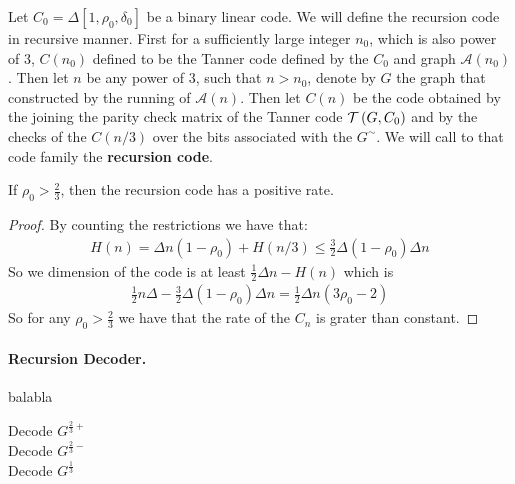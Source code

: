 \documentclass{article}
\begin{document}
\begin{definition} Let $C_{0}=\Delta[1,\rho_{0}, \delta_{0}]$ be a binary linear code.  We will define the recursion code in recursive manner. First for a sufficiently large integer $n_{0}$, which is also power of $3$, $C\left( n_{0} \right)$ defined to be the Tanner code defined by the $C_{0}$ and graph $\mathcal{A}\left( n_{0} \right)$. Then let $n$ be any power of $3$, such that $n > n_{0}$, denote by $G$ the graph that constructed by the running of $\mathcal{A}\left( n \right)$.  Then let $C\left( n \right)$ be the code obtained by the joining the parity check matrix of the Tanner code $\mathcal{T}\left( G, C_0 \right)$ and by the checks of the $C\left( n / 3 \right)$ over the bits associated with the $G^{\sim}$. We will call to that code family the \textbf{recursion code}.
\end{definition}
\begin{lemma}
  If $\rho_{0} > \frac{2}{3}$, then the recursion code has a positive rate.
\end{lemma}
\begin{proof}
By counting the restrictions we have that:  
\begin{equation*}
  \begin{split}
    H\left( n \right) = \Delta n \left( 1-\rho_{0} \right) + H\left( n/3 \right) \le \frac{3}{2}\Delta\left( 1 - \rho_{0} \right)\Delta n 
  \end{split}
\end{equation*}
So we dimension of the code is at least  $ \frac{1}{2}\Delta n - H\left( n \right) $ which is 
\begin{equation*}
  \begin{split}
    \frac{1}{2}n\Delta - \frac{3}{2}\Delta\left( 1 - \rho_{0} \right)\Delta n = \frac{1}{2}\Delta n\left(  3 \rho_{0} - 2  \right) 
  \end{split}
\end{equation*}
So for any $\rho_{0} > \frac{2}{3}$ we have that the rate of the $C_{n}$ is grater than constant. 
\end{proof}

\paragraph{Recursion Decoder.}  balabla

\begin{algorithm}[H]
  Decode $G^{\frac{2}{3}+}$ \\
  Decode $G^{\frac{2}{3}-}$ \\
  Decode $G^{\frac{1}{3}}$ \\
\end{algorithm}

\printbibliography 
\end{document}
